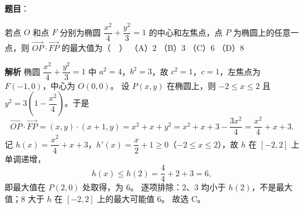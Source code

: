 \begin{answer}

\textbf{题目}：

若点 $O$ 和点 $F$ 分别为椭圆 $\dfrac{x^2}{4}+\dfrac{y^2}{3}=1$ 的中心和左焦点，点 $P$ 为椭圆上的任意一点，则 $\overrightarrow{OP}\cdot\overrightarrow{FP}$ 的最大值为（　）
（A）$2$
（B）$3$
（C）$6$
（D）$8$

\textbf{解析}
椭圆 $\dfrac{x^2}{4}+\dfrac{y^2}{3}=1$ 中 $a^2=4$，$b^2=3$，故 $c^2=1$，$c=1$，左焦点为 $F(-1,0)$，中心为 $O(0,0)$。
设 $P(x,y)$ 在椭圆上，则 $-2\leqslant x\leqslant2$ 且 $y^2=3\left(1-\dfrac{x^2}{4}\right)$。于是
\nopagebreak[4]
\[\overrightarrow{OP}\cdot\overrightarrow{FP}=(x,y)\cdot(x+1,y)=x^2+x+y^2
=x^2+x+3-\frac{3x^2}{4}=\frac{x^2}{4}+x+3.\]
记 $h(x)=\dfrac{x^2}{4}+x+3$，$h'(x)=\dfrac x2+1\geqslant0$（$-2\leqslant x\leqslant2$），故 $h$ 在 $[-2,2]$ 上单调递增，
\nopagebreak[4]
\[h(x)\leqslant h(2)=\frac44+2+3=6,\]
即最大值在 $P(2,0)$ 处取得，为 $6$。
逐项排除：$2$、$3$ 均小于 $h(2)$，不是最大值；$8$ 大于 $h$ 在 $[-2,2]$ 上的最大可能值 $6$。
故选 C。


\end{answer}
